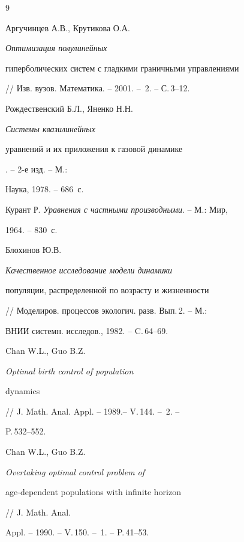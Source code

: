 \begin{thebibliography}{9}







Аргучинцев А.В., Крутикова О.А. {\em Оптимизация полулинейных


гиперболических систем с гладкими граничными управлениями}


// Изв. вузов. Математика. -- 2001. --  \No\,2. -- С.\,3--12.




Рождественский Б.Л., Яненко Н.Н. {\em Системы квазилинейных


уравнений и их приложения к газовой динамике}. -- 2-е изд. -- М.:


Наука, 1978. -- 686~с.




Курант Р.  {\em Уравнения с частными производными}. -- М.: Мир,


1964. -- 830~с.




Блохинов Ю.В. {\em Качественное исследование модели динамики


популяции, распределенной по возрасту и жизненности}


// Моделиров. процессов экологич. разв. Вып.\,2. -- М.:


ВНИИ системн. исследов., 1982. -- C.\,64--69.




Chan W.L., Guo B.Z. {\em Optimal birth control of population


dynamics} // J. Math. Anal. Appl. -- 1989.-- V.\,144. --  \No\,2. --


P.\,532--552.




Chan W.L., Guo B.Z. {\em Overtaking optimal control problem of


age-dependent populations with infinite horizon}  // J. Math. Anal.


Appl.  -- 1990. -- V.\,150. -- \No\,1. -- P.\,41--53.





\end{thebibliography}





\vskip 2cm












\label{end}





